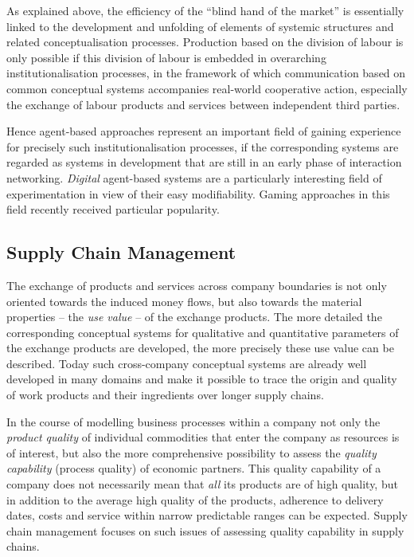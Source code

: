 \documentclass[11pt,a4paper]{article}
\begin{document}
As explained above, the efficiency of the \enquote{blind hand of the market}
is essentially linked to the development and unfolding of elements of systemic
structures and related conceptualisation processes. Production based on the
division of labour is only possible if this division of labour is embedded in
overarching institutionalisation processes, in the framework of which
communication based on common conceptual systems accompanies real-world
cooperative action, especially the exchange of labour products and services
between independent third parties.

Hence agent-based approaches represent an important field of gaining
experience for precisely such institutionalisation processes, if the
corresponding systems are regarded as systems in development that are still in
an early phase of interaction networking. \emph{Digital} agent-based systems
are a particularly interesting field of experimentation in view of their easy
modifiability. Gaming approaches in this field recently received particular
popularity.

\subsection{Supply Chain Management}

The exchange of products and services across company boundaries is not only
oriented towards the induced money flows, but also towards the material
properties -- the \emph{use value} -- of the exchange products. The more
detailed the corresponding conceptual systems for qualitative and quantitative
parameters of the exchange products are developed, the more precisely these
use value can be described. Today such cross-company conceptual systems are
already well developed in many domains and make it possible to trace the
origin and quality of work products and their ingredients over longer supply
chains.

In the course of modelling business processes within a company not only the
\emph{product quality} of individual commodities that enter the company as
resources is of interest, but also the more comprehensive possibility to
assess the \emph{quality capability} (process quality) of economic partners.
This quality capability of a company does not necessarily mean that \emph{all}
its products are of high quality, but in addition to the average high quality
of the products, adherence to delivery dates, costs and service within narrow
predictable ranges can be expected. Supply chain management focuses on such
issues of assessing quality capability in supply chains.
\end{document}
